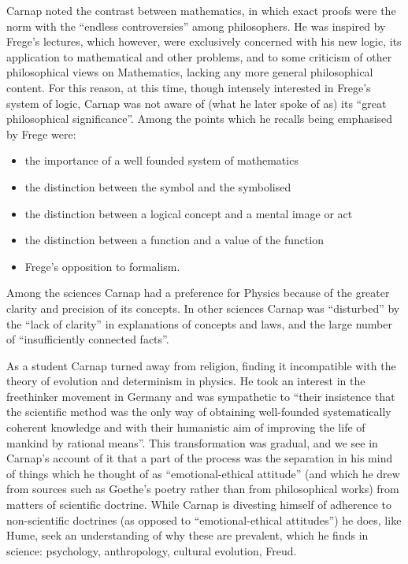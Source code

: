 \documentclass[10pt,titlepage]{book}
\begin{document}
Carnap noted the contrast between mathematics, in which exact proofs were the norm with the ``endless controversies'' among philosophers. 
He was inspired by Frege's lectures, which however, were exclusively concerned with his new logic, its application to mathematical and other problems, and to some criticism of other philosophical views on Mathematics, lacking any more general philosophical content.
For this reason, at this time, though intensely interested in Frege's system of logic, Carnap was not aware of (what he later spoke of as) its ``great philosophical significance''.
Among the points which he recalls being emphasised by Frege were:
\begin{itemize}
\item the importance of a well founded system of mathematics
\item the distinction between the symbol and the symbolised
\item the distinction between a logical concept and a mental image or act
\item the distinction between a function and a value of the function
\item Frege's opposition to formalism.
\end{itemize}

Among the sciences Carnap had a preference for Physics because of the greater clarity and precision of its concepts.
In other sciences Carnap was ``disturbed'' by the ``lack of clarity'' in explanations of concepts and laws, and the large number of ``insufficiently connected facts''.

As a student Carnap turned away from religion, finding it incompatible with the theory of evolution and determinism in physics.
He took an interest in the freethinker movement in Germany and was sympathetic to ``their insistence that the scientific method was the only way of obtaining well-founded systematically coherent knowledge and with their humanistic aim of improving the life of mankind by rational means''.
This transformation was gradual, and we see in Carnap's account of it that a part of the process was the separation in his mind of things which he thought of as ``emotional-ethical attitude'' (and which he drew from sources such as Goethe's poetry rather than from philosophical works) from matters of scientific doctrine.
While Carnap is divesting himself of adherence to non-scientific doctrines (as opposed to ``emotional-ethical attitudes'') he does, like Hume, seek an understanding of why these are prevalent, which he finds in science: psychology, anthropology, cultural evolution, Freud.
\end{document}
